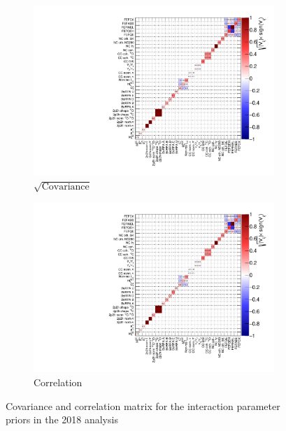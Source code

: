 \begin{figure}[h]
	\begin{subfigure}[t]{0.49\textwidth}
		\includegraphics[width=\textwidth,page=1, trim={0mm 0mm 0mm 0mm}, clip]{figures/niwg/xsec_covariance_2018a_NOMINAL_v11_xseccov}
		\caption{$\sqrt{\text{Covariance}}$}
	\end{subfigure}
	\begin{subfigure}[t]{0.49\textwidth}
		\includegraphics[width=\textwidth,page=2, trim={0mm 0mm 0mm 0mm}, clip]{figures/niwg/xsec_covariance_2018a_NOMINAL_v11_xseccov}
		\caption{Correlation}
	\end{subfigure}
	\caption{Covariance and correlation matrix for the interaction parameter priors in the 2018 analysis}
	\label{fig:xsec_cov_corr_2018}
\end{figure}

